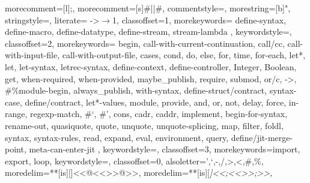 


 {
  morecomment=[l]{;},         %
  morecomment=[s]{\#|}{|\#},  %
  commentstyle={\color{ForestGreen}\slshape\sffamily},
  morestring=[b]",
  stringstyle=\color{red},
  literate=%
    {->}{{$\rightarrow$}}1,
  classoffset=1,
    morekeywords={
      define-syntax, define-macro, define-datatype, define-stream, stream-lambda
    },
    keywordstyle=\color{blue},
  classoffset=2,
    morekeywords={
      begin, call-with-current-continuation, call/cc, call-with-input-file, call-with-output-file,
      cases, cond, do, else, for, time, for-each,
      let*, let, let-syntax, letrec-syntax,
      define-context, define-controller, Integer, Boolean, get, when-required, when-provided,
      maybe_publish, require, submod, or/c, ->, \#\%module-begin, always_publish, with-syntax, define-struct/contract, syntax-case, define/contract,
      let*-values,
      module, provide,
      and, or, not,
      delay, force, in-range, regexp-match,
      \#`, \#',
      cons, cadr, caddr,
      implement, begin-for-syntax, rename-out,
      quasiquote, quote, unquote, unquote-splicing,
      map, filter, foldl, syntax, syntax-rules, read, expand, eval, environment, query,
      define/jit-merge-point, meta-can-enter-jit
    },
    keywordstyle=\color{blue},
  classoffset=3,
    morekeywords={import, export, loop},
    keywordstyle=\color{Purple},
  classoffset=0,
  alsoletter={',`,-,/,>,<,\#,\%},
  moredelim=**[is][\color{lightgray}]{<<@<<}{>>@>>},
  moredelim=**[is][\itshape\color{OliveGreen}]{<<;<<}{>>;>>},
}

